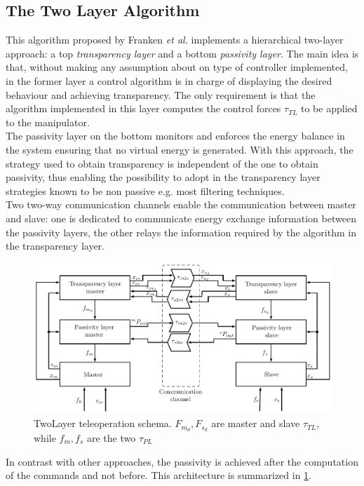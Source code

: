  \subsection{The Two Layer Algorithm}\label{Two-Layer-Approach}
This algorithm proposed by Franken \textit{et al.} \cite{Franken2011} implements a hierarchical two-layer approach: a top \textit{transparency layer} and a bottom \textit{passivity layer}.
The main idea is that, without making any assumption about on type of controller implemented, in the former layer a control algorithm is in charge of displaying the desired behaviour and achieving transparency. The only requirement is that the algorithm implemented in this layer computes the control forces $\tau_{TL}$ to be applied to the manipulator.\\
The passivity layer on the bottom monitors and enforces the energy balance in the system ensuring that no virtual energy is generated.
With this approach, the strategy used to obtain transparency is independent  of the one to obtain passivity, thus enabling the possibility to adopt in the transparency layer strategies known to be non passive e.g. most filtering techniques.\\
Two two-way communication channels enable the communication between master and slave: one is dedicated to communicate energy exchange information between the passivity layers, the other relays the information required by the algorithm in the transparency layer.
\begin{figure}
	\includegraphics[width=\textwidth]{schemas/TwoLayer.pdf}
	\caption[TwoLayer teleoperation schema]{TwoLayer teleoperation schema. $F_{m_{d}},F_{s_{d}}$ are master and slave $\tau_{TL}$, while $f_{m}, f_{s}$ are the two $\tau_{PL}$}
	\label{sch:TwoLayer}
\end{figure}
In contrast with other approaches, the passivity is achieved after the computation of the commands and not before. This architecture is summarized in \figurename{\ref{sch:TwoLayer}}.

